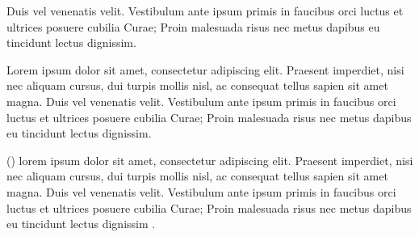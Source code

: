 Duis vel venenatis velit. Vestibulum ante ipsum primis in faucibus orci 
luctus et ultrices posuere cubilia Curae; Proin malesuada risus nec metus dapibus 
eu tincidunt lectus dignissim.

Lorem ipsum dolor sit amet, consectetur adipiscing elit. Praesent imperdiet, nisi 
nec aliquam cursus, dui turpis mollis nisl, ac consequat tellus sapien sit amet 
magna. Duis vel venenatis velit. Vestibulum ante ipsum primis in faucibus orci 
luctus et ultrices posuere cubilia Curae; Proin malesuada risus nec metus dapibus 
eu tincidunt lectus dignissim.

\citeauthor*{nelson88} (\citeyear{nelson88}) lorem ipsum dolor sit amet, consectetur adipiscing elit. Praesent imperdiet, nisi 
nec aliquam cursus, dui turpis mollis nisl, ac consequat tellus sapien sit amet 
magna. Duis vel venenatis velit. Vestibulum ante ipsum primis in faucibus orci 
luctus et ultrices posuere cubilia Curae; Proin malesuada risus nec metus dapibus 
eu tincidunt lectus dignissim .


